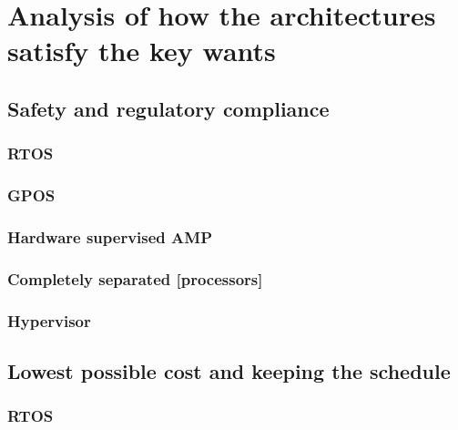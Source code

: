 
\chapter{Analysis of how the architectures satisfy the key wants} %

\label{Chapter4} %


\newcommand{\keyword}[1]{\textbf{#1}}
\newcommand{\tabhead}[1]{\textbf{#1}}
\newcommand{\code}[1]{\texttt{#1}}
\newcommand{\file}[1]{\texttt{\bfseries#1}}
\newcommand{\option}[1]{\texttt{\itshape#1}}


\section{Safety and regulatory compliance}
\subsection{RTOS}
\subsection{GPOS}
\subsection{Hardware supervised AMP}
\subsection{Completely separated [processors]}
\subsection{Hypervisor}


\section{Lowest possible cost and keeping the schedule}
\subsection{RTOS}
